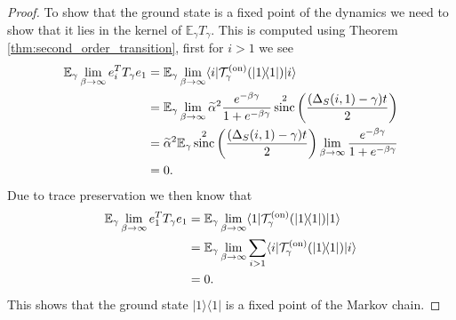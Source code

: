 \documentclass{article}
\newcommand{\on}{\rm on}
\newcommand{\ket}[1]{|#1\rangle}
\newcommand{\bra}[1]{\langle #1|}
\newcommand{\ketbra}[2]{| #1\rangle\! \langle #2|}
\newcommand{\EE}{\mathbb{E}}
\newcommand{\TT}{\mathcal{T}}
\DeclareMathOperator{\sinc}{sinc}
\begin{document}
\begin{proof}
To show that the ground state is a fixed point of the dynamics we need to show that it lies in the kernel of $\EE_\gamma T_\gamma$. This is computed using Theorem \ref{thm:second_order_transition}, first for $i > 1$ we see
\begin{align}
     \EE_\gamma \lim_{\beta \to \infty} e_i^T T_\gamma e_1 &=  \EE_\gamma \lim_{\beta \to \infty} \bra{i} \TT_\gamma^{(\on)}(\ketbra{1}{1})\ket{i} \\
    &= \EE_\gamma \lim_{\beta \to \infty} \widetilde{\alpha}^2 \frac{e^{-\beta \gamma}}{1 + e^{-\beta \gamma}} \sinc^2\left( \frac{(\Delta_S(i, 1) - \gamma) t }{2} \right) \\
    &= \widetilde{\alpha}^2 \EE_\gamma \sinc^2\left( \frac{(\Delta_S(i, 1) - \gamma) t }{2} \right) \lim_{\beta \to \infty} \frac{e^{-\beta \gamma}}{1 + e^{-\beta \gamma}} \\
    &= 0.
\end{align}
Due to trace preservation we then know that 
\begin{align}
    \EE_\gamma \lim_{\beta \to \infty} e_1^T T_\gamma e_1 &= \EE_\gamma \lim_{\beta \to \infty} \bra{1} \TT_\gamma^{(\on)}(\ketbra{1}{1}) \ket{1} \\
    &= \EE_\gamma \lim_{\beta \to \infty} \sum_{i > 1} \bra{i} \TT_\gamma^{(\on)}(\ketbra{1}{1}) \ket{i} \\
    &= 0.
\end{align}
This shows that the ground state $\ketbra{1}{1}$ is a fixed point of the Markov chain.


\end{proof}
\end{document}
